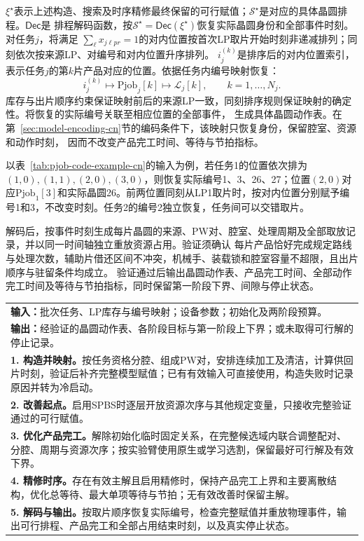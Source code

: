 $\xi^\star$表示上述构造、搜索及时序精修最终保留的可行赋值；$\mathcal S^\star$是对应的具体晶圆排程。$\mathsf{Dec}$是
排程解码函数，按$\mathcal S^\star=\mathsf{Dec}(\xi^\star)$恢复实际晶圆身份和全部事件时刻。对任务$j$，将满足
$\sum_\ell x_{j\ell pr}=1$的对内位置按首次LP取片开始时刻非递减排列；同刻依次按来源LP、对编号和对内位置升序排列。
$i_j^{(k)}$是排序后的对内位置索引，表示任务$j$的第$k$片产品对应的位置。依据任务内编号映射恢复：
\begin{equation}
i_j^{(k)}\longmapsto\mathrm{Pjob}_j[k]
\longmapsto\mathcal L_j[k],\qquad k=1,\ldots,N_j.
\label{eq:pjob-decoding-cn}
\end{equation}
库存与出片顺序约束保证映射前后的来源LP一致，同刻排序规则保证映射的确定性。将恢复的实际编号关联至相应位置的全部事件，
生成具体晶圆动作表。在第~\ref{sec:model-encoding-cn}节的编码条件下，该映射只恢复身份，保留腔室、资源和动作时刻，
因而不改变产品完工时间、等待与节拍指标。

以表~\ref{tab:pjob-code-example-cn}的输入为例，若任务1的位置依次排为$(1,0),(1,1),(2,0),(3,0)$，则恢复实际编号1、3、26、27；位置$(2,0)$对应$\mathrm{Pjob}_1[3]$和实际晶圆26。前两位置同刻从LP1取片时，按对内位置分别赋予编号1和3，不改变时刻。任务2的编号2独立恢复，任务间可以交错取片。

解码后，按事件时刻生成每片晶圆的来源、PW对、腔室、处理周期及全部取放记录，并以同一时间轴独立重放资源占用。验证须确认
每片产品恰好完成规定路线与处理次数，辅助片借还区间不冲突，机械手、装载锁和腔室容量不超限，且出片顺序与驻留条件均成立。
验证通过后输出晶圆动作表、产品完工时间、全部动作完工时间及等待与节拍指标，同时保留第一阶段下界、间隙与停止状态。


\begin{table}[!htbp]
\raggedright\footnotesize
{}\label{alg:model4-cn}
\begin{tabularx}{\linewidth}{X}\toprule
\textbf{输入：}批次任务、LP库存与编号映射；设备参数；初始化及两阶段预算。\\
\textbf{输出：}经验证的晶圆动作表、各阶段目标与第一阶段上下界；或未取得可行解的停止记录。\\\midrule
\textbf{1. 构造并映射。}按任务资格分腔、组成PW对，安排连续加工及清洁，计算供回片时刻，验证后补齐完整模型赋值；已有有效输入可直接使用，构造失败时记录原因并转为冷启动。\\
\textbf{2. 改善起点。}启用SPBS时逐层开放资源次序与其他规定变量，只接收完整验证通过的可行赋值。\\
\textbf{3. 优化产品完工。}解除初始化临时固定关系，在完整候选域内联合调整配对、分腔、周期与资源次序；按实验臂使用原生或学习选割，保留最好可行解及有效下界。\\
\textbf{4. 精修时序。}存在有效主解且启用精修时，保持产品完工上界和主要离散结构，优化总等待、最大单项等待与节拍；无有效改善时保留主解。\\
\textbf{5. 解码与输出。}按取片顺序恢复实际编号，检查完整赋值并重放物理事件，输出可行排程、产品完工和全部占用结束时刻，以及真实停止状态。\\\bottomrule
\end{tabularx}
\end{table}
\FloatBarrier
\clearpage
